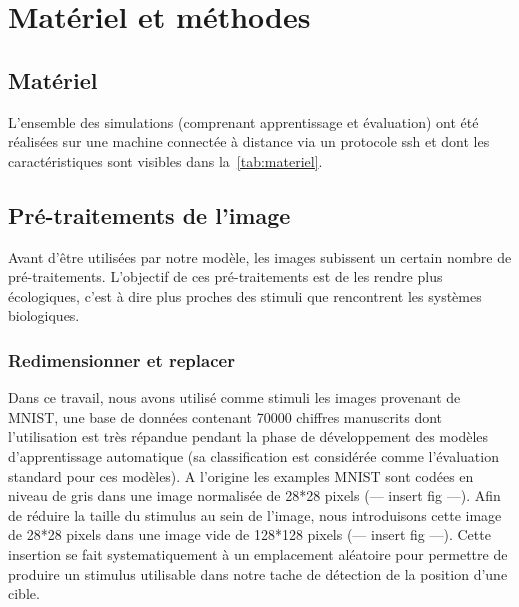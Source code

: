 
\chapter{Matériel et méthodes} %
\label{Materiel_methode} %

\section{Matériel}
L'ensemble des simulations (comprenant apprentissage et évaluation) ont été réalisées sur une machine connectée à distance via un protocole ssh et dont les caractéristiques sont visibles dans la~\autoref{tab:materiel}. \\

\section{Pré-traitements de l'image}
Avant d'être utilisées par notre modèle, les images subissent un certain nombre de pré-traitements. L'objectif de ces pré-traitements est de les rendre plus écologiques, c'est à dire plus proches des stimuli que rencontrent les systèmes biologiques.

\subsection{Redimensionner et replacer}
Dans ce travail, nous avons utilisé comme stimuli les images provenant de MNIST, une base de données contenant 70000 chiffres manuscrits dont l'utilisation est très répandue pendant la phase de développement des modèles d'apprentissage automatique (sa classification est considérée comme l'évaluation standard pour ces modèles).
A l'origine les examples MNIST sont codées en niveau de gris dans une image normalisée de 28*28 pixels (--- insert fig ---).
Afin de réduire la taille du stimulus au sein de l'image, nous introduisons cette image de 28*28 pixels dans une image vide de 128*128 pixels (--- insert fig ---).
Cette insertion se fait systematiquement à un emplacement aléatoire pour permettre de produire un stimulus utilisable dans notre tache de détection de la position d'une cible.

